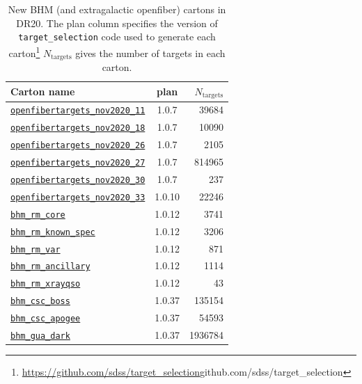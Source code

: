 
\begin{table}[ht]
\centering
\caption{New BHM (and extragalactic openfiber) cartons in DR20.
The plan column specifies the version of \texttt{target\_selection} code used to generate each
carton\footnote{\url{https://github.com/sdss/target_selection}{github.com/sdss/target\_selection}}
$N_\mathrm{targets}$ gives the number of targets in each carton.}
\label{tab:bhm_cartons}
\begin{tabular}{lcr}
Carton name & plan & $N_\mathrm{targets}$ \\
\hline
\hyperref[openfibertargets_nov2020_11_plan1.0.7]{\texttt{openfibertargets\_nov2020\_11}} & 1.0.7 & 39684 \\
\hyperref[openfibertargets_nov2020_18_plan1.0.7]{\texttt{openfibertargets\_nov2020\_18}} & 1.0.7 & 10090 \\
\hyperref[openfibertargets_nov2020_26_plan1.0.7]{\texttt{openfibertargets\_nov2020\_26}} & 1.0.7 & 2105 \\
\hyperref[openfibertargets_nov2020_27_plan1.0.7]{\texttt{openfibertargets\_nov2020\_27}} & 1.0.7 & 814965 \\
\hyperref[openfibertargets_nov2020_30_plan1.0.7]{\texttt{openfibertargets\_nov2020\_30}} & 1.0.7 & 237 \\
\hyperref[openfibertargets_nov2020_33_plan1.0.10]{\texttt{openfibertargets\_nov2020\_33}} & 1.0.10 & 22246 \\
\hyperref[bhm_rm_core_plan1.0.12]{\texttt{bhm\_rm\_core}} & 1.0.12 & 3741 \\
\hyperref[bhm_rm_known_spec_plan1.0.12]{\texttt{bhm\_rm\_known\_spec}} & 1.0.12 & 3206 \\
\hyperref[bhm_rm_var_plan1.0.12]{\texttt{bhm\_rm\_var}} & 1.0.12 & 871 \\
\hyperref[bhm_rm_ancillary_plan1.0.12]{\texttt{bhm\_rm\_ancillary}} & 1.0.12 & 1114 \\
\hyperref[bhm_rm_xrayqso_plan1.0.12]{\texttt{bhm\_rm\_xrayqso}} & 1.0.12 & 43 \\
\hyperref[bhm_csc_boss_plan1.0.37]{\texttt{bhm\_csc\_boss}} & 1.0.37 & 135154 \\
\hyperref[bhm_csc_apogee_plan1.0.37]{\texttt{bhm\_csc\_apogee}} & 1.0.37 & 54593 \\
\hyperref[bhm_gua_dark_plan1.0.37]{\texttt{bhm\_gua\_dark}} & 1.0.37 & 1936784 \\

\end{tabular}
\end{table}
